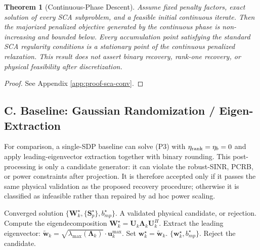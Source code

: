 \documentclass[12pt,a4paper]{article}
\newtheorem{theorem}{Theorem}
\newcommand{\vect}[1]{\mathbf{#1}}
\newcommand{\mat}[1]{\mathbf{#1}}
\begin{document}
\begin{theorem}[Continuous-Phase Descent]\label{thm:sca-conv}
Assume fixed penalty factors, exact solution of every SCA subproblem, and a feasible initial continuous iterate. Then the majorized penalized objective generated by the continuous phase is non-increasing and bounded below. Every accumulation point satisfying the standard SCA regularity conditions is a stationary point of the continuous penalized relaxation. This result does not assert binary recovery, rank-one recovery, or physical feasibility after discretization.
\end{theorem}

\begin{proof}
See Appendix \ref{app:proof-sca-conv}.
\end{proof}

\subsection*{C. Baseline: Gaussian Randomization / Eigen-Extraction}

For comparison, a single-SDP baseline can solve (P3) with $\eta_{\rm rank}=\eta_b=0$ and apply leading-eigenvector extraction together with binary rounding. This post-processing is only a candidate generator: it can violate the robust-SINR, PCRB, or power constraints after projection. It is therefore accepted only if it passes the same physical validation as the proposed recovery procedure; otherwise it is classified as infeasible rather than repaired by ad hoc power scaling.

\begin{algorithm}[htbp]
\caption{Rank-One Beamforming Extraction (Baseline Post-Processing)}
\label{alg:rank1}
\begin{algorithmic}[1]
\Require Converged solution $\{\mat{W}_k^\star, \{\mat{S}_p^\star\}, b_{mp}^\star\}$.
\Ensure A validated physical candidate, or rejection.
    \State Compute the eigendecomposition $\mat{W}_k^\star = \mat{U}_k \mat{\Lambda}_k \mat{U}_k^H$.
    \State Extract the leading eigenvector: $\tilde{\vect{w}}_k = \sqrt{\lambda_{\max}(\mat{\Lambda}_k)} \cdot \mat{u}_k^{\max}$.
    \State Set $\vect{w}_k^\star=\tilde{\vect{w}}_k$.
\EndFor
{}
    \State \Return $\{\vect{w}_k^\star, b_{mp}^\star\}$.
\Else
    \State Reject the candidate.
\EndIf
\end{algorithmic}
\end{algorithm}
\end{document}
